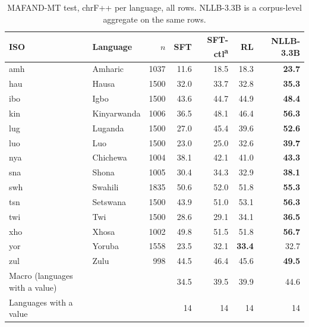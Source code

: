 \begin{table}[t]
\centering\footnotesize
\setlength{\tabcolsep}{3pt}
\begin{tabular}{@{}llrrrrr@{}}
\toprule
ISO & Language & $n$ & SFT & SFT-ctl\textsuperscript{a} & RL & NLLB-3.3B \\
\midrule
amh & Amharic & 1037 & 11.6 & 18.5 & 18.3 & \textbf{23.7} \\
hau & Hausa & 1500 & 32.0 & 33.7 & 32.8 & \textbf{35.3} \\
ibo & Igbo & 1500 & 43.6 & 44.7 & 44.9 & \textbf{48.4} \\
kin & Kinyarwanda & 1006 & 36.5 & 48.1 & 46.4 & \textbf{56.3} \\
lug & Luganda & 1500 & 27.0 & 45.4 & 39.6 & \textbf{52.6} \\
luo & Luo & 1500 & 23.0 & 25.0 & 32.6 & \textbf{39.7} \\
nya & Chichewa & 1004 & 38.1 & 42.1 & 41.0 & \textbf{43.3} \\
sna & Shona & 1005 & 30.4 & 34.3 & 32.9 & \textbf{38.1} \\
swh & Swahili & 1835 & 50.6 & 52.0 & 51.8 & \textbf{55.3} \\
tsn & Setswana & 1500 & 43.9 & 51.0 & 53.1 & \textbf{56.3} \\
twi & Twi & 1500 & 28.6 & 29.1 & 34.1 & \textbf{36.5} \\
xho & Xhosa & 1002 & 49.8 & 51.5 & 51.8 & \textbf{56.7} \\
yor & Yoruba & 1558 & 23.5 & 32.1 & \textbf{33.4} & 32.7 \\
zul & Zulu & 998 & 44.5 & 46.4 & 45.6 & \textbf{49.5} \\
\midrule
Macro (languages with a value) & & & 34.5 & 39.5 & 39.9 & 44.6 \\
Languages with a value & & & 14 & 14 & 14 & 14 \\
\bottomrule
\end{tabular}
\caption{MAFAND-MT test, chrF++ per language, all rows. NLLB-3.3B is a corpus-level aggregate on the same rows.}
\label{tab:full-mafand-chrfpp}
\end{table}
